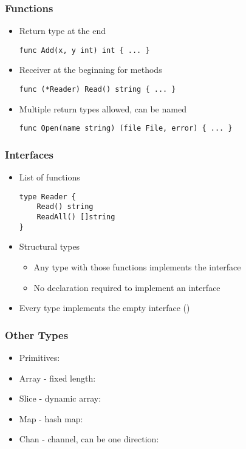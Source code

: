 \documentclass[12pt]{beamer}
\begin{document}

\begin{frame}[fragile]
\frametitle{Functions}
\begin{itemize}
\item Return type at the end
\begin{verbatim}
func Add(x, y int) int { ... } 
\end{verbatim}
\item Receiver at the beginning for methods
\begin{verbatim}
func (*Reader) Read() string { ... } 
\end{verbatim}
\item Multiple return types allowed, can be named
\begin{verbatim}
func Open(name string) (file File, error) { ... } 
\end{verbatim}
\end{itemize}
\end{frame}


\begin{frame}[fragile]
\frametitle{Interfaces}
\begin{itemize}
\item List of functions
\begin{verbatim}
type Reader {
    Read() string
    ReadAll() []string
}
\end{verbatim}
\item Structural types
  \begin{itemize}
  \item Any type with those functions implements the interface
  \item No declaration required to implement an interface
  \end{itemize}
\item Every type implements the empty interface ()
\end{itemize}
\end{frame}


\begin{frame}[fragile]
\frametitle{Other Types}
\begin{itemize}
\item Primitives: 
\item Array - fixed length: 
\item Slice - dynamic array: 
\item Map - hash map: 
\item Chan - channel, can be one direction: \\
\end{itemize}
\end{frame}
\end{document}
